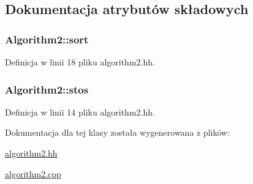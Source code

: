 \subsection{Dokumentacja atrybutów składowych}
\hypertarget{class_algorithm2_a4b4a1db106f55fa866863e2babe5dc75}{
\subsubsection[{sort}]{ Algorithm2\-::sort\hspace{0.3cm}{\ttfamily [private]}}}\label{class_algorithm2_a4b4a1db106f55fa866863e2babe5dc75}


Definicja w linii 18 pliku algorithm2.\-hh.

\hypertarget{class_algorithm2_a02585cbfa5330f4719cf97c02729e74a}{
\subsubsection[{stos}]{ Algorithm2\-::stos\hspace{0.3cm}{\ttfamily [private]}}}\label{class_algorithm2_a02585cbfa5330f4719cf97c02729e74a}


Definicja w linii 14 pliku algorithm2.\-hh.



Dokumentacja dla tej klasy została wygenerowana z plików\-:\begin{DoxyCompactItemize}
\item 
\hyperlink{algorithm2_8hh}{algorithm2.\-hh}\item 
\hyperlink{algorithm2_8cpp}{algorithm2.\-cpp}\end{DoxyCompactItemize}
